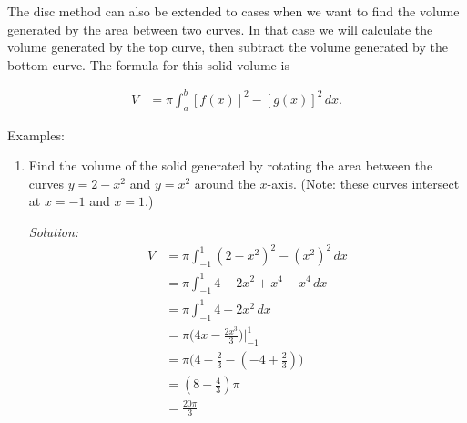 \documentclass[16pt]{article}
\theoremstyle{remark}
\begin{document}
The disc method can also be extended to cases when we want to find the volume generated by the area between two curves. In that case we will calculate the volume generated by the top curve, then subtract the volume generated by the bottom curve. The formula for this solid volume is

\begin{align*}
V &= \pi \int_a^b  {[ f(x) ]}^2  - {[ g(x) ]}^2 \, dx.
\end{align*}

Examples:
\begin{enumerate}
\item Find the volume of the solid generated by rotating the area between the curves $y=2-x^2$ and $y=x^2$ around the $x$-axis. (Note: these curves intersect at $x=-1$ and $x=1$.)
\begin{mdframed}[style=TheoremFrame]
\textit{Solution:}
\begin{align*}
V &= \pi \int_{-1}^1 (2-x^2)^2 - (x^2)^2 \, dx\\
&= \pi \int_{-1}^1 4-2x^2+x^4 - x^4 \, dx\\
&= \pi \int_{-1}^1 4-2x^2 \, dx\\
&= \pi \big(4x-\frac{2x^3}{3}\big) \bigg|_{-1}^1\\
&= \pi \big(4-\frac{2}{3} - (-4+\frac{2}{3})\big)\\
&= (8-\frac{4}{3})\pi\\
&= \frac{20\pi}{3}
\end{align*}
\end{mdframed}
\end{enumerate}
\end{document}

